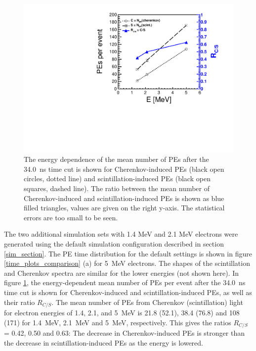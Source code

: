\documentclass[cits]{JINST}
\begin{document}
\begin{figure}
        \begin{center}
        \includegraphics[scale=0.5]{graphs/PEandR_vs_energy_final.pdf}
        \caption[]{The energy dependence of the mean number of PEs after the 34.0~ns time cut is shown for Cherenkov-induced PEs (black open circles, dotted line) and scintillation-induced PEs (black open squares, dashed line). The ratio between the mean number of Cherenkov-induced and scintillation-induced PEs is shown as blue filled triangles, values are given on the right y-axis. The statistical errors are too small to be seen. \label{Edep_NPE}}
        \end{center}
\end{figure}

The two additional simulation sets with 1.4 MeV and 2.1 MeV electrons were
generated using the default simulation configuration described in section
\ref{sim_section}. The PE time distribution for the default settings is shown
in figure \ref{time_plots_comparison} (a) for 5~MeV electrons. The shapes
of the scintillation and Cherenkov spectra are similar for the lower energies (not
shown here). In figure \ref{Edep_NPE}, the energy-dependent mean number of
PEs per event after the 34.0~ns time cut is shown for Cherenkov-induced and
scintillation-induced PEs, as well as their ratio $R_{C/S}$. The mean number
of PEs from Cherenkov (scintillation) light for electron energies of 1.4, 2.1, and 5~MeV is 21.8 (52.1), 38.4 (76.8)
and 108 (171) for 1.4~MeV, 2.1~MeV and 5~MeV, respectively. This gives the
ratios $R_{C/S}$ = 0.42, 0.50 and 0.63: The decrease in Cherenkov-induced
PEs is stronger than the decrease in scintillation-induced PEs as the energy
is lowered.
\end{document}
